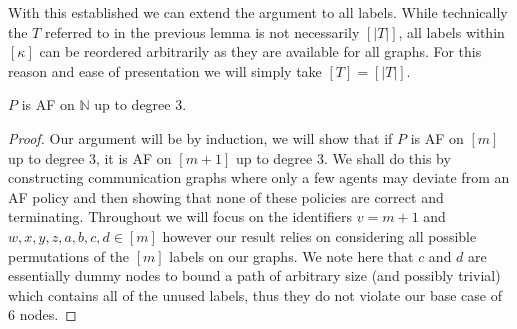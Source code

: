 With this established we can extend the argument to all labels.
While technically the $T$ referred to in the previous lemma is not necessarily $[|T|]$, all labels within $[\kappa]$ can be reordered arbitrarily as they are available for all graphs.
For this reason and ease of presentation we will simply take $[T]=[|T|]$.
\begin{lemma}
    \label{lemma: id induction}
    $P$ is AF on $\mathbb{N}$ up to degree $3$.
\end{lemma}
\begin{proof}
    Our argument will be by induction, we will show that if $P$ is AF on $[m]$ up to degree $3$, it is AF on $[m+1]$ up to degree $3$. We shall do this by constructing communication graphs where only a few agents may deviate from an AF policy and then showing that none of these policies are correct and terminating. Throughout we will focus on the identifiers $v=m+1$ and $w,x,y,z,a,b,c,d \in [m]$ however our result relies on considering all possible permutations of the $[m]$ labels on our graphs. We note here that $c$ and $d$ are essentially dummy nodes to bound a path of arbitrary size (and possibly trivial) which contains all of the unused labels, thus they do not violate our base case of 6 nodes.


\end{proof}
